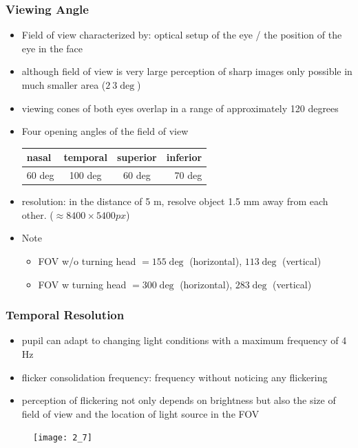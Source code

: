 \documentclass{standalone}
\begin{document}
\subsubsection{Viewing Angle}
\begin{itemize}
	\item Field of view characterized by: optical setup of the eye / the position of the eye in the face
	\item although field of view is very large perception of sharp images only possible in much smaller area ($2 ~ 3\deg$)
	\item viewing cones of both eyes overlap in a range of approximately 120 degrees
	\item Four opening angles of the field of view
\begin{table}[H]
\centering
\begin{tabular}{|l|c|c|r|}
\hline
 nasal & temporal & superior & inferior \\ \hline
60 deg & 100 deg & 60 deg & 70 deg \\ \hline
\end{tabular}
\end{table}
	\item resolution: in the distance of 5 m, resolve object 1.5 mm away from each other. ($\approx 8400 \times 5400 px$)
	\item Note 
		\begin{itemize} 
			\item FOV w/o turning head $= 155\deg$ (horizontal), $113\deg$ (vertical) 
			\item FOV w turning head $= 300\deg$ (horizontal), $283\deg$ (vertical) 
		\end{itemize}
\end{itemize}
\subsubsection{Temporal Resolution}
\begin{itemize}
	\item pupil can adapt to changing light conditions with a maximum frequency of 4 Hz	
	\item flicker consolidation frequency: frequency without noticing any flickering
	\item perception of flickering not only depends on brightness but also the size of field of view and the location of light source in the FOV
\end{itemize}

\begin{figure}[H]
	\texttt{[image: 2\_7]}
\end{figure}
\end{document}
